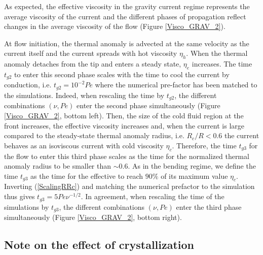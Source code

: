 As expected,  the effective  viscosity in  the gravity  current regime
represents  the average  viscosity of  the current  and the  different
phases of propagation reflect changes  in the average viscosity of the
flow (Figure \ref{Visco_GRAV_2}).

At  flow initiation,  the  thermal  anomaly is  advected  at the  same
velocity as the  current itself  and the  current spreads  with hot
viscosity $\eta_h$. When the thermal anomaly detaches from the tip and
enters a steady state, $\eta_e$ increases.  The time $t_{g2}$ to enter
this  second  phase scales  with  the  time  to  cool the  current  by
conduction,  i.e.  $t_{g2}=10^{-2}Pe$  where the  numerical pre-factor
has been matched to the  simulations.  Indeed, when rescaling the time
by $t_{g2}$,  the different  combinations $(\nu,Pe)$ enter  the second
phase simultaneously (Figure  \ref{Visco_GRAV_2}, bottom left).  Then,
the  size  of the  cold  fluid  region  at  the front  increases,  the
effective viscosity increases and, when  the current is large compared
to  the steady-state  thermal  anomaly radius,  i.e.  $R_c/R<0.6$  the
current behaves as an isoviscous current with cold viscosity $\eta_c$.
Therefore, the  time $t_{g3}$ for the  flow to enter this  third phase
scales as  the time for  the normalized  thermal anomaly radius  to be
smaller than $\sim0.6$.  As in the  bending regime, we define the time
$t_{g3}$ as the time for the  effective to reach $90\%$ of its maximum
value  $\eta_c$.    Inverting  (\ref{ScalingRRc})  and   matching  the
numerical     prefactor    to     the     simulation    thus     gives
$t_{g3}=5 Pe\nu^{-1/2}$. In agreement, when  rescaling the time of the
simulations by  $t_{g3}$, the different combinations  $(\nu,Pe)$ enter
the  third  phase simultaneously  (Figure  \ref{Visco_GRAV_2},
bottom right).

\subsection{Note on the effect of crystallization}
\label{sec:note-effect-cryst-2}

